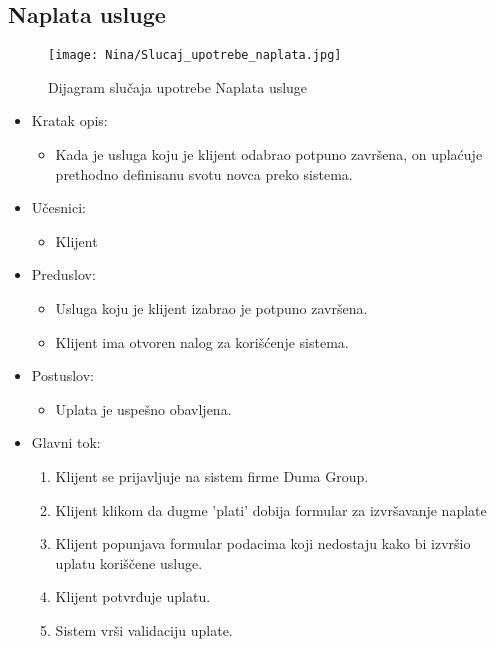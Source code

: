 \documentclass[a4paper]{article}
\begin{document}

\subsection{Naplata usluge}

\begin{figure}[H]
    \centering
    \texttt{[image: Nina/Slucaj\_upotrebe\_naplata.jpg]}
    \caption{Dijagram slučaja upotrebe Naplata usluge}
    \label{fig:RegistracijaZ}
\end{figure}

\begin{itemize}
    \item Kratak opis: 
    \begin{itemize}
        \item Kada je usluga koju je klijent odabrao potpuno završena, on uplaćuje prethodno definisanu svotu novca preko sistema.
    \end{itemize}
    \item Učesnici:
        \begin{itemize}
        \item Klijent
    \end{itemize}
    \item Preduslov:
        \begin{itemize}
            \item Usluga koju je klijent izabrao je potpuno završena.
            \item Klijent ima otvoren nalog za korišćenje sistema.
        \end{itemize}
    \item Postuslov:
        \begin{itemize}
            \item Uplata je uspešno obavljena.
            \end{itemize}
    \item Glavni tok:
        \begin{enumerate}
            \item Klijent se prijavljuje na sistem firme Duma Group.
            \item Klijent klikom da dugme 'plati' dobija formular za izvršavanje naplate
            \item Klijent popunjava formular podacima koji nedostaju kako bi izvršio uplatu koriščene usluge.
            \item Klijent potvrđuje uplatu.
            \item Sistem vrši validaciju uplate.

\end{enumerate}
\end{itemize}
\end{document}
